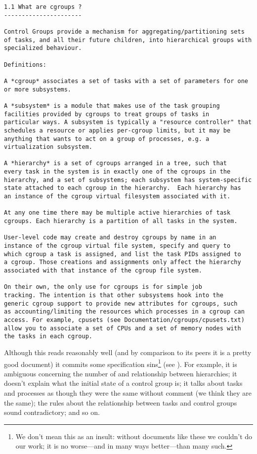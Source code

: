 \documentclass[a4paper,twoside,12pt]{article}
\begin{document}
{\scriptsize \begin{verbatim}
1.1 What are cgroups ?
----------------------

Control Groups provide a mechanism for aggregating/partitioning sets
of tasks, and all their future children, into hierarchical groups with
specialized behaviour.

Definitions:

A *cgroup* associates a set of tasks with a set of parameters for one
or more subsystems.

A *subsystem* is a module that makes use of the task grouping
facilities provided by cgroups to treat groups of tasks in
particular ways. A subsystem is typically a "resource controller" that
schedules a resource or applies per-cgroup limits, but it may be
anything that wants to act on a group of processes, e.g. a
virtualization subsystem.

A *hierarchy* is a set of cgroups arranged in a tree, such that
every task in the system is in exactly one of the cgroups in the
hierarchy, and a set of subsystems; each subsystem has system-specific
state attached to each cgroup in the hierarchy.  Each hierarchy has
an instance of the cgroup virtual filesystem associated with it.

At any one time there may be multiple active hierarchies of task
cgroups. Each hierarchy is a partition of all tasks in the system.

User-level code may create and destroy cgroups by name in an
instance of the cgroup virtual file system, specify and query to
which cgroup a task is assigned, and list the task PIDs assigned to
a cgroup. Those creations and assignments only affect the hierarchy
associated with that instance of the cgroup file system.

On their own, the only use for cgroups is for simple job
tracking. The intention is that other subsystems hook into the
generic cgroup support to provide new attributes for cgroups, such
as accounting/limiting the resources which processes in a cgroup can
access. For example, cpusets (see Documentation/cgroups/cpusets.txt)
allow you to associate a set of CPUs and a set of memory nodes with
the tasks in each cgroup.
\end{verbatim}}

Although this reads reasonably well (and by comparison to its peers it is a pretty good document) it commits some
specification sins\footnote{We don't mean this as an insult: without documents like these we couldn't do our work;
it is no worse---and in many ways better---than many such.} (see \cite{7sins}).
For example, it is ambiguous concerning the number of and relationship between hierarchies; it
doesn't explain what the initial state of a control group is; it talks about tasks and processes as though they were the same without comment (we think they are the same);
the rules about the relationship between tasks and control groups sound contradictory; and so on.
\end{document}
